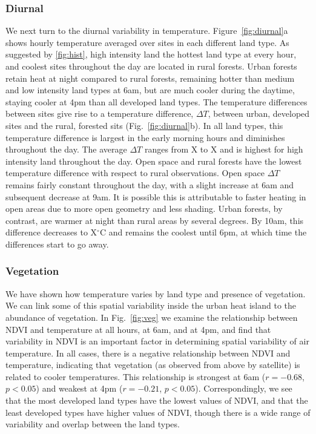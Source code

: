 \documentclass[draft,linenumbers]{agujournal}
\begin{document}
\subsubsection{Diurnal}
We next turn to the diurnal variability in temperature. Figure~\ref{fig:diurnal}a shows hourly temperature averaged over sites in each different land type. As suggested by \ref{fig:hist}, high intensity land the hottest land type at every hour, and coolest sites throughout the day are located in rural forests. Urban forests retain heat at night compared to rural forests, remaining hotter than medium and low intensity land types at 6am, but are much cooler during the daytime, staying cooler at 4pm than all developed land types. 
The temperature differences between sites give rise to a temperature difference, $\Delta T$, between urban, developed sites and the rural, forested sits (Fig.~\ref{fig:diurnal}b). In all land types, this temperature difference is largest in the early morning hours and diminishes throughout the day. The average $\Delta T$ ranges from X to X
and is highest for high intensity land throughout the day. Open space and rural forests have the lowest temperature difference with respect to rural observations. Open space $\Delta T$ remains fairly constant throughout the day, with a slight increase at 6am and subsequent decrease at 9am. It is possible this is attributable to faster heating in open areas due to more open geometry and less shading. Urban forests, by contrast, are warmer at night than rural areas by several degrees. By 10am, this difference decreases to X$^\circ$C 
and remains the coolest until 6pm, at which time the differences start to go away. 

\subsubsection{Vegetation}
We have shown how temperature varies by land type and presence of vegetation. We can link some of this spatial variability inside the urban heat island to the abundance of vegetation. In Fig.~\ref{fig:veg} we examine the relationship between NDVI and temperature at all hours, at 6am, and at 4pm, and find that variability in NDVI is an important factor in determining spatial variability of air temperature. In all cases, there is a negative relationship between NDVI and temperature, indicating that vegetation (as observed from above by satellite) is related to cooler temperatures. This relationship is strongest at 6am ($r = -0.68$, $p< 0.05$) and weakest at 4pm ($r= -0.21$, $p<0.05$). Correspondingly, we see that the most developed land types have the lowest values of NDVI, and that the least developed types have higher values of NDVI, though there is a wide range of variability and overlap between the land types. 
\end{document}
